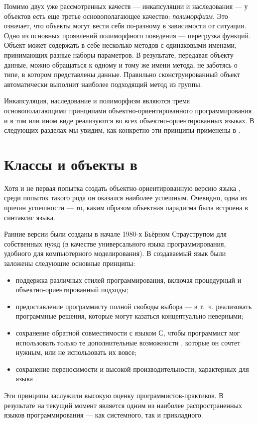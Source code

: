 Помимо двух уже рассмотренных качеств --- инкапсуляции и наследования --- у объектов есть еще третье основополагающее
качество: \emph{полиморфизм}. Это означает, что объекты  могут вести себя
по-разному в зависимости от ситуации. Одно из основных проявлений полиморфного поведения --- перегрузка функций. Объект
может содержать в себе несколько методов с одинаковыми именами, принимающих разные наборы параметров. В результате,
передавая объекту данные, можно обращаться к одному и тому же имени метода, не заботясь о типе, в котором представлены
данные. Правильно сконструированный объект автоматически выполнит наиболее подходящий метод из группы.

Инкапсуляция, наследование и полиморфизм являются тремя основополагающими принципами объектно-ориентированного
программирования и в том или ином виде реализуются во всех объектно-ориентированных языках. В следующих разделах мы
увидим, как конкретно эти принципы применены в .

\section[Классы и объекты в \Sys{C++}]{Классы и объекты в }
Хотя  и не первая попытка создать объектно-ориентированную версию языка , среди попыток такого рода он оказался
наиболее успешным. Очевидно, одна из причин успешности --- то, каким образом объектная парадигма была встроена в
синтаксис языка. 

Ранние версии  были созданы в начале 1980-х Бьёрном Страуструпом для собственных нужд (в качестве универсального
языка программирования, удобного для компьютерного моделирования). В создаваемый язык были заложены следующие основные
принципы:

\begin{itemize}
\item поддержка различных стилей программирования, включая процедурный и объектно-ориентированный подходы;
\item предоставление программисту полной свободы выбора --- в т.~ч. реализовать программные решения, которые могут
казаться концептуально неверными;
\item сохранение обратной совместимости с языком С, чтобы программист мог использовать только те дополнительные
возможности , которые он сочтет нужным, или не использовать их вовсе;
\item сохранение переносимости и высокой производительности, характерных для языка .
\end{itemize}
Эти принципы заслужили высокую оценку программистов-практиков. В результате на текущий момент  является одним из
наиболее распространенных языков программирования --- как системного, так и прикладного. 


